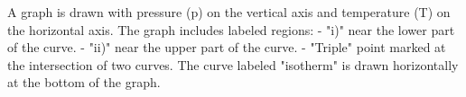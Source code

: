 A graph is drawn with pressure (p) on the vertical axis and temperature (T) on the horizontal axis. The graph includes labeled regions:  
- "i)" near the lower part of the curve.  
- "ii)" near the upper part of the curve.  
- "Triple" point marked at the intersection of two curves.  
The curve labeled "isotherm" is drawn horizontally at the bottom of the graph.